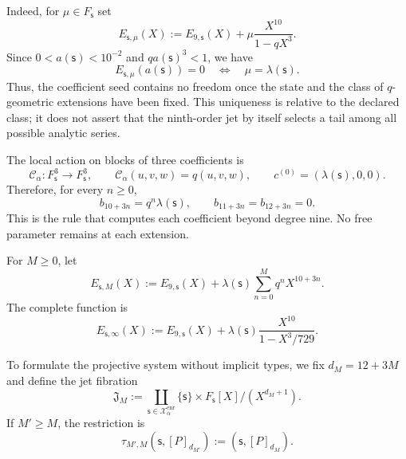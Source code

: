 Indeed, for \(\mu\in F_{\mathsf s}\) set
\[
 E_{\mathsf s,\mu}(X)
 :=E_{9,\mathsf s}(X)+\mu\frac{X^{10}}{1-qX^3}.
\]
Since \(0<a(\mathsf s)<10^{-2}\) and \(qa(\mathsf s)^3<1\), we have
\begin{equation}
 E_{\mathsf s,\mu}(a(\mathsf s))=0
 \quad\Longleftrightarrow\quad
 \mu=\lambda(\mathsf s).
 \label{eq:alpha-unicidad-lambda-clase-geometrica}
\end{equation}
Thus, the coefficient seed contains no freedom once the state
and the class of \(q\)-geometric extensions have been fixed. This uniqueness is relative to the
declared class; it does not assert that the ninth-order jet by itself selects a
tail among all possible analytic series.

The local action on blocks of three coefficients is
\begin{equation}
 \mathcal C_\alpha:F_{\mathsf s}^{3}\longrightarrow F_{\mathsf s}^{3},
 \qquad \mathcal C_\alpha(u,v,w)=q(u,v,w),
 \qquad c^{(0)}=(\lambda(\mathsf s),0,0).
 \label{eq:alpha-accion-coeficientes}
\end{equation}
Therefore, for every \(n\geq0\),
\begin{equation}
 b_{10+3n}=q^n\lambda(\mathsf s),\qquad
 b_{11+3n}=b_{12+3n}=0.
 \label{eq:alpha-recurrencia-coeficientes}
\end{equation}
This is the rule that computes each coefficient beyond degree nine. No
free parameter remains at each extension.

For \(M\geq0\), let
\begin{equation}
 E_{\mathsf s,M}(X):=E_{9,\mathsf s}(X)
 +\lambda(\mathsf s)\sum_{n=0}^{M}q^nX^{10+3n}.
 \label{eq:alpha-truncamientos-completos}
\end{equation}
The complete function is
\begin{equation}
 E_{\mathsf s,\infty}(X)
 :=E_{9,\mathsf s}(X)
 +\lambda(\mathsf s)\frac{X^{10}}{1-X^3/729}.
 \label{eq:alpha-funcion-completa-explicita}
\end{equation}

To formulate the projective system without implicit types, we fix
\(d_M=12+3M\) and define the jet fibration
\begin{equation}
 \mathfrak J_M:=
 \coprod_{\mathsf s\in\mathcal X_\alpha^{\mathrm{enr}}}
 \{\mathsf s\}\times F_{\mathsf s}[X]/(X^{d_M+1}).
 \label{eq:alpha-espacio-jets-rev08}
\end{equation}
If \(M'\ge M\), the restriction is
\begin{equation}
 \tau_{M',M}(\mathsf s,[P]_{d_{M'}})
 :=(\mathsf s,[P]_{d_M}).
 \label{eq:alpha-truncamiento-jets-rev08}
\end{equation}

